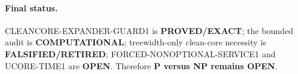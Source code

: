 \documentclass[11pt]{article}
\newcommand{\status}[1]{\textbf{#1}}
\begin{document}
\paragraph{Final status.}
\textsf{CLEANCORE-EXPANDER-GUARD1} is \status{PROVED/EXACT}; the bounded
audit is \status{COMPUTATIONAL}; treewidth-only clean-core necessity is
\status{FALSIFIED/RETIRED}; FORCED-NONOPTIONAL-SERVICE1 and UCORE-TIME1 are
\status{OPEN}.  Therefore \textbf{P versus NP remains OPEN}.

\end{document}
